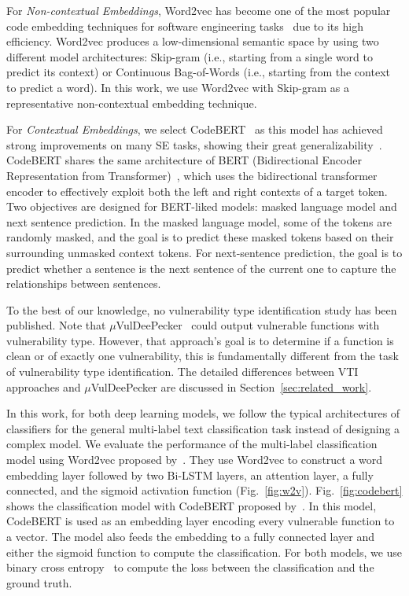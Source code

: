 For \textit{Non-contextual Embeddings}, Word2vec has become one of the most popular code embedding techniques for software engineering tasks~\citep{zhang2019novel,embedding_emse22} due to its high efficiency. Word2vec produces a low-dimensional semantic space by using two different model architectures: Skip-gram (i.e., starting from a single word to predict its context) or Continuous Bag-of-Words (i.e., starting from the context to predict a word).
In this work, we use Word2vec with Skip-gram as a representative non-contextual embedding technique.

For \textit{Contextual Embeddings}, we select CodeBERT~\citep{codebert} as this model has achieved strong improvements on many SE tasks, showing their great generalizability~\citep{assessing_codebert, embedding_emse22}. 
%
CodeBERT shares the same architecture of BERT (Bidirectional Encoder Representation from Transformer)~\citep{bert}, which uses the bidirectional transformer encoder to effectively exploit both the left and right contexts of a target token. Two objectives are designed for BERT-liked models: masked language model and next sentence prediction. In the masked language model, some of the tokens are randomly masked, and the goal is to predict these masked tokens based on their surrounding unmasked context tokens. For next-sentence prediction, the goal is to predict whether a sentence is the next sentence of the current one to capture the relationships between sentences.

To the best of our knowledge, no vulnerability type identification study has been published. 
%
Note that $\mu$VulDeePecker~\cite{mu_vuldeeppeker} could output vulnerable functions with vulnerability type. However, that approach's goal is to determine if a function is clean or of exactly one vulnerability, this is fundamentally different from the task of vulnerability type identification. The detailed differences between VTI approaches and $\mu$VulDeePecker are discussed in Section~\ref{sec:related_work}.
%

In this work, for both deep learning models, we follow the typical architectures of classifiers for the general multi-label text classification task instead of designing a complex model.
%
We evaluate the performance of the multi-label classification model using Word2vec proposed by~\cite{text_multi_label}. They use Word2vec to construct a word embedding layer followed by two Bi-LSTM layers, an attention layer, a fully connected, and the sigmoid activation function (Fig.~\ref{fig:w2v}).
%
Fig.~\ref{fig:codebert} shows the classification model with CodeBERT proposed by~\cite{assessing_codebert}. In this model, CodeBERT is used as an embedding layer encoding every vulnerable function to a vector. The model also feeds the embedding to a fully connected layer and either the sigmoid function to compute the classification.
%
For both models, we use binary cross entropy~\cite{text_multi_label} to compute the loss between the classification and the ground truth.






